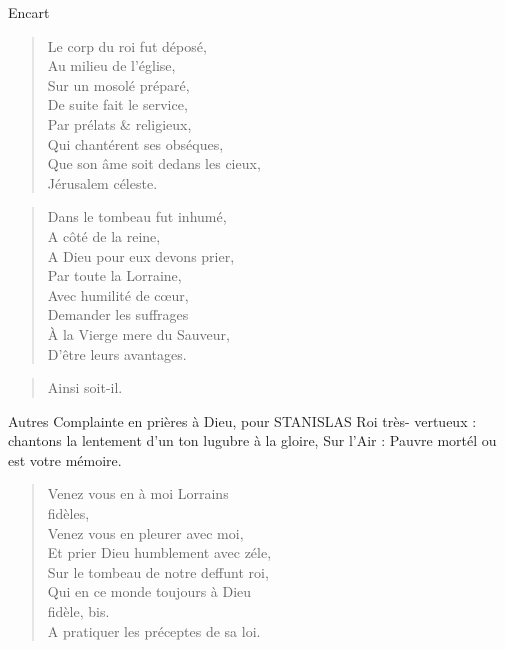 \begin{diary}{Encart}{}
        \begin{verse}Le corp du roi fut déposé,\\Au milieu de l’église,\\Sur un mosolé préparé,\\De suite fait le service,\\Par prélats \& religieux,\\Qui chantérent ses obséques,\\Que son âme soit dedans les cieux,\\Jérusalem céleste.\\\end{verse}
        \bigskip

        \begin{verse}Dans le tombeau fut inhumé,\\A côté de la reine,\\A Dieu pour eux devons prier,\\Par toute la Lorraine,\\Avec humilité de cœur,\\Demander les suffrages\\À la Vierge mere du Sauveur,\\D'être leurs avantages.\\\end{verse}
        \bigskip

        \begin{verse}Ainsi soit-il.\\\end{verse}
        \bigskip

         Autres Complainte en prières à Dieu, pour STANISLAS Roi très-
                              vertueux : chantons la lentement d’un ton lugubre à la gloire,
                              Sur l'Air :
                              Pauvre mortél ou est votre mémoire. \bigskip

        \begin{verse}Venez vous en à moi Lorrains\\fidèles,\\Venez vous en pleurer avec moi,\\Et prier Dieu humblement avec zéle,\\Sur le tombeau de notre deffunt
                                    roi,\\Qui en ce monde toujours à Dieu\\fidèle, bis.\\A pratiquer les préceptes de sa loi.\\\end{verse}
        \bigskip


\end{diary}
